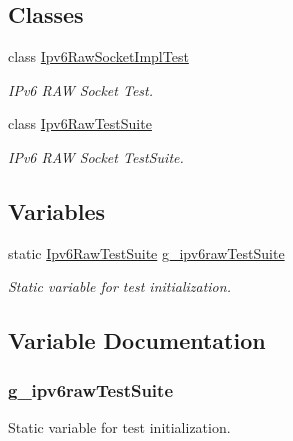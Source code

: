 \subsection*{Classes}
\begin{DoxyCompactItemize}
\item 
class \hyperlink{classIpv6RawSocketImplTest}{Ipv6\+Raw\+Socket\+Impl\+Test}
\begin{DoxyCompactList}\small\item\em I\+Pv6 R\+AW Socket Test. \end{DoxyCompactList}\item 
class \hyperlink{classIpv6RawTestSuite}{Ipv6\+Raw\+Test\+Suite}
\begin{DoxyCompactList}\small\item\em I\+Pv6 R\+AW Socket Test\+Suite. \end{DoxyCompactList}\end{DoxyCompactItemize}
\subsection*{Variables}
\begin{DoxyCompactItemize}
\item 
static \hyperlink{classIpv6RawTestSuite}{Ipv6\+Raw\+Test\+Suite} \hyperlink{ipv6-raw-test_8cc_ac4a15e4d8f6e2ed0fedfd62cf2f4a194}{g\+\_\+ipv6raw\+Test\+Suite}
\begin{DoxyCompactList}\small\item\em Static variable for test initialization. \end{DoxyCompactList}\end{DoxyCompactItemize}


\subsection{Variable Documentation}
\subsubsection[{\texorpdfstring{g\+\_\+ipv6raw\+Test\+Suite}{g_ipv6rawTestSuite}}]{ g\+\_\+ipv6raw\+Test\+Suite\hspace{0.3cm}{\ttfamily [static]}}\hypertarget{ipv6-raw-test_8cc_ac4a15e4d8f6e2ed0fedfd62cf2f4a194}{}\label{ipv6-raw-test_8cc_ac4a15e4d8f6e2ed0fedfd62cf2f4a194}


Static variable for test initialization. 

